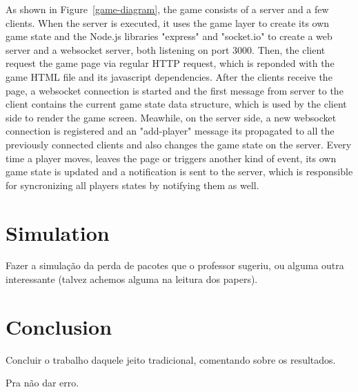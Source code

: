 \documentclass[english]{sbrt}
\begin{document}
As shown in Figure~\ref{game-diagram}, the game consists of a server and a few clients. When the server is executed, it uses the game layer to create its own game state and the Node.js libraries "express" and "socket.io" to create a web server and a websocket server, both listening on port 3000.
Then, the client request the game page via regular HTTP request, which is reponded with the game HTML file and its javascript dependencies. After the clients receive the page, a websocket connection is started and the first message from server to the client contains the current
game state data structure, which is used by the client side to render the game screen. Meawhile, on the server side, a new websocket connection is registered and an "add-player" message its propagated to all the previously connected clients and also changes the game state on the server.
Every time a player moves, leaves the page or triggers another kind of event, its own game state is updated and a notification is sent to the server, which is responsible for syncronizing all players states by notifying them as well.

\section{\textbf{Simulation}}
Fazer a simulação da perda de pacotes que o professor sugeriu, ou alguma outra interessante (talvez achemos alguma na leitura dos papers).

\section{\textbf{Conclusion}}
Concluir o trabalho daquele jeito tradicional, comentando sobre os resultados.

\cite{maodv01} Pra não dar erro.



\end{document}
